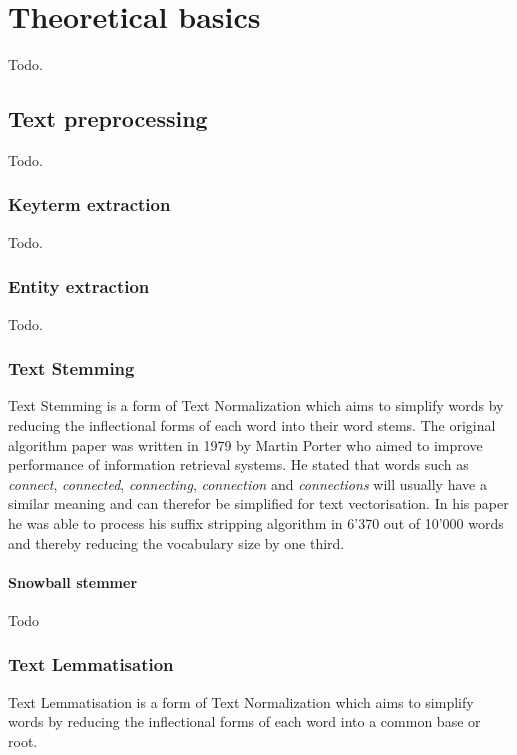 \section{Theoretical basics}
Todo.

\subsection{Text preprocessing}
Todo.

\subsubsection{Keyterm extraction}
Todo.

\subsubsection{Entity extraction}
Todo.

\subsubsection{Text Stemming}
Text Stemming is a form of Text Normalization which aims to simplify words
by reducing the inflectional forms of each word into their word stems.
The original algorithm paper was written in 1979 by Martin Porter who aimed
to improve performance of information retrieval systems.
He stated that words such as \textit{connect}, \textit{connected}, \textit{connecting},
\textit{connection} and \textit{connections} will usually have a similar meaning and can therefor
be simplified for text vectorisation.
In his paper he was able to process his suffix stripping algorithm in 6'370 out of 10'000 words and thereby
reducing the vocabulary size by one third.

\paragraph{Snowball stemmer}
Todo

\subsubsection{Text Lemmatisation}
Text Lemmatisation is a form of Text Normalization which aims to simplify words
by reducing the inflectional forms of each word into a common base or root.

